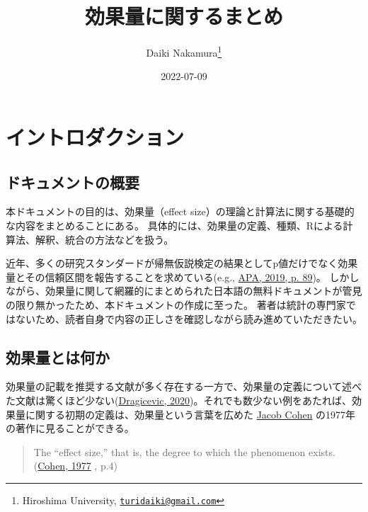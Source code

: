 \documentclass[
  ja=standard, xelatex, base=12pt]{bxjsreport}
\title{効果量に関するまとめ}
\author{Daiki Nakamura\footnote{Hiroshima University, \href{mailto:turidaiki@gmail.com}{\nolinkurl{turidaiki@gmail.com}}}}
\date{2022-07-09}
\begin{document}
\maketitle

{
\setcounter{tocdepth}{1}
\tableofcontents
}
\hypertarget{ux30a4ux30f3ux30c8ux30edux30c0ux30afux30b7ux30e7ux30f3}{%
\chapter{イントロダクション}\label{ux30a4ux30f3ux30c8ux30edux30c0ux30afux30b7ux30e7ux30f3}}

\hypertarget{ux30c9ux30adux30e5ux30e1ux30f3ux30c8ux306eux6982ux8981}{%
\section{ドキュメントの概要}\label{ux30c9ux30adux30e5ux30e1ux30f3ux30c8ux306eux6982ux8981}}

本ドキュメントの目的は、効果量（effect size）の理論と計算法に関する基礎的な内容をまとめることにある。 具体的には、効果量の定義、種類、Rによる計算法、解釈、統合の方法などを扱う。

近年、多くの研究スタンダードが帰無仮説検定の結果としてp値だけでなく効果量とその信頼区間を報告することを求めている(e.g., \protect\hyperlink{ref-american2019publication}{APA, 2019, p. 89})。 しかしながら、効果量に関して網羅的にまとめられた日本語の無料ドキュメントが管見の限り無かったため、本ドキュメントの作成に至った。 著者は統計の専門家ではないため、読者自身で内容の正しさを確認しながら読み進めていただきたい。

\hypertarget{ux52b9ux679cux91cfux3068ux306fux4f55ux304b}{%
\section{効果量とは何か}\label{ux52b9ux679cux91cfux3068ux306fux4f55ux304b}}

効果量の記載を推奨する文献が多く存在する一方で、効果量の定義について述べた文献は驚くほど少ない(\protect\hyperlink{ref-dragicevic2020mean}{Dragicevic, 2020})。それでも数少ない例をあたれば、効果量に関する初期の定義は、効果量という言葉を広めた \href{https://en.wikipedia.org/wiki/Jacob_Cohen_(statistician)}{Jacob Cohen} の1977年の著作に見ることができる。

\begin{quote}
The ``effect size,'' that is, the degree to which the phenomenon exists. (\protect\hyperlink{ref-cohen1977statistical}{Cohen, 1977} , p.4)
\end{quote}
\end{document}
